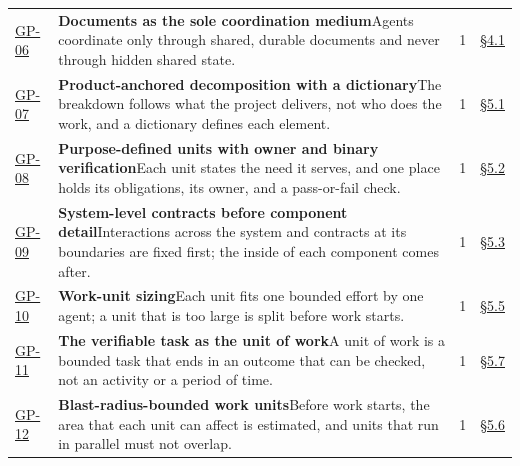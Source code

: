 \begin{longtable}{@{}p{} p{} r p{}@{}}
\hyperlink{gp-06}{GP-06}\hypertarget{gp-06}{} & \textbf{Documents as the sole coordination medium}\newline Agents coordinate only through shared, durable documents and never through hidden shared state.\rule[-\normalbaselineskip]{0pt}{0pt} & 1 & \hyperlink{nss-4.1}{\S4.1}\rule[-\normalbaselineskip]{0pt}{0pt} \\
\hyperlink{gp-07}{GP-07}\hypertarget{gp-07}{} & \textbf{Product-anchored decomposition with a dictionary}\newline The breakdown follows what the project delivers, not who does the work, and a dictionary defines each element.\rule[-\normalbaselineskip]{0pt}{0pt} & 1 & \hyperlink{nss-5.1}{\S5.1}\rule[-\normalbaselineskip]{0pt}{0pt} \\
\hyperlink{gp-08}{GP-08}\hypertarget{gp-08}{} & \textbf{Purpose-defined units with owner and binary verification}\newline Each unit states the need it serves, and one place holds its obligations, its owner, and a pass-or-fail check.\rule[-\normalbaselineskip]{0pt}{0pt} & 1 & \hyperlink{nss-5.2}{\S5.2}\rule[-\normalbaselineskip]{0pt}{0pt} \\
\hyperlink{gp-09}{GP-09}\hypertarget{gp-09}{} & \textbf{System-level contracts before component detail}\newline Interactions across the system and contracts at its boundaries are fixed first; the inside of each component comes after.\rule[-\normalbaselineskip]{0pt}{0pt} & 1 & \hyperlink{nss-5.3}{\S5.3}\rule[-\normalbaselineskip]{0pt}{0pt} \\
\hyperlink{gp-10}{GP-10}\hypertarget{gp-10}{} & \textbf{Work-unit sizing}\newline Each unit fits one bounded effort by one agent; a unit that is too large is split before work starts.\rule[-\normalbaselineskip]{0pt}{0pt} & 1 & \hyperlink{nss-5.5}{\S5.5}\rule[-\normalbaselineskip]{0pt}{0pt} \\
\hyperlink{gp-11}{GP-11}\hypertarget{gp-11}{} & \textbf{The verifiable task as the unit of work}\newline A unit of work is a bounded task that ends in an outcome that can be checked, not an activity or a period of time.\rule[-\normalbaselineskip]{0pt}{0pt} & 1 & \hyperlink{nss-5.7}{\S5.7}\rule[-\normalbaselineskip]{0pt}{0pt} \\
\hyperlink{gp-12}{GP-12}\hypertarget{gp-12}{} & \textbf{Blast-radius-bounded work units}\newline Before work starts, the area that each unit can affect is estimated, and units that run in parallel must not overlap.\rule[-\normalbaselineskip]{0pt}{0pt} & 1 & \hyperlink{nss-5.6}{\S5.6}\rule[-\normalbaselineskip]{0pt}{0pt} \\

\end{longtable}
